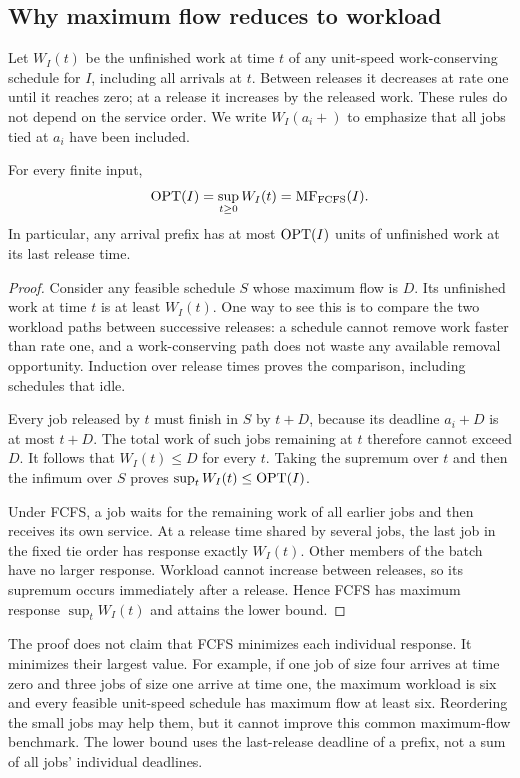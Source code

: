 \subsection{Why maximum flow reduces to workload}
Let $W_I(t)$ be the unfinished work at time $t$ of any unit-speed work-conserving schedule for $I$, including all arrivals at $t$. Between releases it decreases at rate one until it reaches zero; at a release it increases by the released work. These rules do not depend on the service order. We write $W_I(a_i+)$ to emphasize that all jobs tied at $a_i$ have been included.

\begin{lemma}\label{lem:workload}
For every finite input,
\begin{equation}\label{eq:workload-opt}
 \operatorname{OPT}(I)=\sup_{t\geq0}W_I(t)=\operatorname{MF}_{\rm FCFS}(I).
\end{equation}
In particular, any arrival prefix has at most $\operatorname{OPT}(I)$ units of unfinished work at its last release time.
\end{lemma}
\begin{proof}
Consider any feasible schedule $S$ whose maximum flow is $D$. Its unfinished work at time $t$ is at least $W_I(t)$. One way to see this is to compare the two workload paths between successive releases: a schedule cannot remove work faster than rate one, and a work-conserving path does not waste any available removal opportunity. Induction over release times proves the comparison, including schedules that idle.

Every job released by $t$ must finish in $S$ by $t+D$, because its deadline $a_i+D$ is at most $t+D$. The total work of such jobs remaining at $t$ therefore cannot exceed $D$. It follows that $W_I(t)\leq D$ for every $t$. Taking the supremum over $t$ and then the infimum over $S$ proves $\sup_tW_I(t)\leq\operatorname{OPT}(I)$.

Under FCFS, a job waits for the remaining work of all earlier jobs and then receives its own service. At a release time shared by several jobs, the last job in the fixed tie order has response exactly $W_I(t)$. Other members of the batch have no larger response. Workload cannot increase between releases, so its supremum occurs immediately after a release. Hence FCFS has maximum response $\sup_tW_I(t)$ and attains the lower bound.
\end{proof}

The proof does not claim that FCFS minimizes each individual response. It minimizes their largest value. For example, if one job of size four arrives at time zero and three jobs of size one arrive at time one, the maximum workload is six and every feasible unit-speed schedule has maximum flow at least six. Reordering the small jobs may help them, but it cannot improve this common maximum-flow benchmark. The lower bound uses the last-release deadline of a prefix, not a sum of all jobs' individual deadlines.

